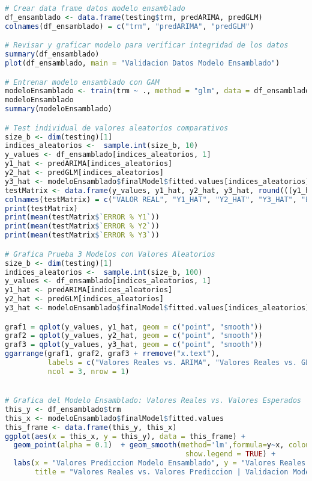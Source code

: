 \begin{lstlisting}[language=R]
# Crear data frame datos modelo ensamblado 
df_ensamblado <- data.frame(testing$trm, predARIMA, predGLM)
colnames(df_ensamblado) = c("trm", "predARIMA", "predGLM")

# Revisar y graficar modelo para verificar integridad de los datos
summary(df_ensamblado)
plot(df_ensamblado, main = "Validacion Datos Modelo Ensamblado")

# Entrenar modelo ensamblado con GAM
modeloEnsamblado <- train(trm ~ ., method = "glm", data = df_ensamblado)
modeloEnsamblado
summary(modeloEnsamblado)

# Test individual de valores aleatorios comparativos
size_b <- dim(testing)[1]
indices_aleatorios <-  sample.int(size_b, 10)
y_values <- df_ensamblado[indices_aleatorios, 1]
y1_hat <- predARIMA[indices_aleatorios]
y2_hat <- predGLM[indices_aleatorios]
y3_hat <- modeloEnsamblado$finalModel$fitted.values[indices_aleatorios]
testMatrix <- data.frame(y_values, y1_hat, y2_hat, y3_hat, round(((y1_hat/y_values)-1)*100,1), round(((y2_hat/y_values)-1)*100,1), round(((y3_hat/y_values)-1)*100,1))
colnames(testMatrix) = c("VALOR REAL", "Y1_HAT", "Y2_HAT", "Y3_HAT", "ERROR % Y1", "ERROR % Y2", "ERROR % Y3")
print(testMatrix)
print(mean(testMatrix$`ERROR % Y1`))
print(mean(testMatrix$`ERROR % Y2`))
print(mean(testMatrix$`ERROR % Y3`))

# Grafica Prueba 3 Modelos con Valores Aleatorios
size_b <- dim(testing)[1]
indices_aleatorios <-  sample.int(size_b, 100)
y_values <- df_ensamblado[indices_aleatorios, 1]
y1_hat <- predARIMA[indices_aleatorios]
y2_hat <- predGLM[indices_aleatorios]
y3_hat <- modeloEnsamblado$finalModel$fitted.values[indices_aleatorios]

graf1 = qplot(y_values, y1_hat, geom = c("point", "smooth"))
graf2 = qplot(y_values, y2_hat, geom = c("point", "smooth"))
graf3 = qplot(y_values, y3_hat, geom = c("point", "smooth"))
ggarrange(graf1, graf2, graf3 + rremove("x.text"), 
          labels = c("Valores Reales vs. ARIMA", "Valores Reales vs. GLM", "Valores Reales vs. STACKING"),
          ncol = 3, nrow = 1)


# Grafica del Modelo Ensamblado: Valores Reales vs. Valores Esperados
this_y <- df_ensamblado$trm
this_x <- modeloEnsamblado$finalModel$fitted.values
this_frame <- data.frame(this_y, this_x)
ggplot(aes(x = this_x, y = this_y), data = this_frame) + 
  geom_point(alpha = 0.1)  + geom_smooth(method='lm',formula=y~x, colour = "orange", 
                                          show.legend = TRUE) +
  labs(x = "Valores Prediccion Modelo Ensamblado", y = "Valores Reales TRM", 
       title = "Valores Reales vs. Valores Prediccion | Validacion Modelo Ensamblado")


\end{lstlisting}
